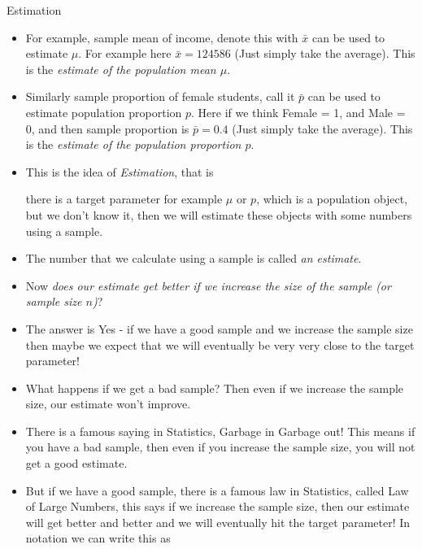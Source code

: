 \documentclass[8pt, usepdftitle=false]{beamer}
\begin{document}
\begin{frame}[allowframebreaks]{Estimation}
\begin{itemize}
  \item For example, \alert{sample mean of income}, denote this with $\bar{x}$ can be used to estimate $\mu$. For example here $\bar{x} = 124586$ (Just simply take the average). This is the \emph{estimate of the population mean $\mu$}.

  \item Similarly \alert{sample proportion of female students}, call it $\bar{p}$ can be used to estimate population proportion $p$. Here if we think Female = 1, and Male = 0, and then sample proportion is $\bar{p} = 0.4$ (Just simply take the average). This is the \emph{estimate of the population proportion $p$}.


  \item This is the idea of \emph{Estimation}, that is

  \medskip
  \alert{there is a target parameter for example $\mu$ or $p$, which is a population object, but we don't know it, then we will estimate these objects with some numbers using a sample}.
  \medskip

  \item The number that we calculate using a sample is called \emph{an estimate}.

  \item Now \emph{does our estimate get better if we increase the size of the sample (or sample size $n$)}? 

  \item The answer is Yes - if we have a good sample and we increase the sample size then maybe we expect that we will \alert{eventually be very very close to the target parameter!}

  \item What happens if we get a bad sample? Then even if we increase the sample size, our estimate won't improve.

  \item There is a famous saying in Statistics, \alert{Garbage in Garbage out!} This means if you have a bad sample, then even if you increase the sample size, you will not get a good estimate. 


  \framebreak

  \item But if we have a good sample, there is a famous law in Statistics, called \alert{Law of Large Numbers}, this says if we increase the sample size, then our estimate will get better and better and we will eventually hit the target parameter! In notation we can write this as


\end{itemize}
\end{frame}
\end{document}
